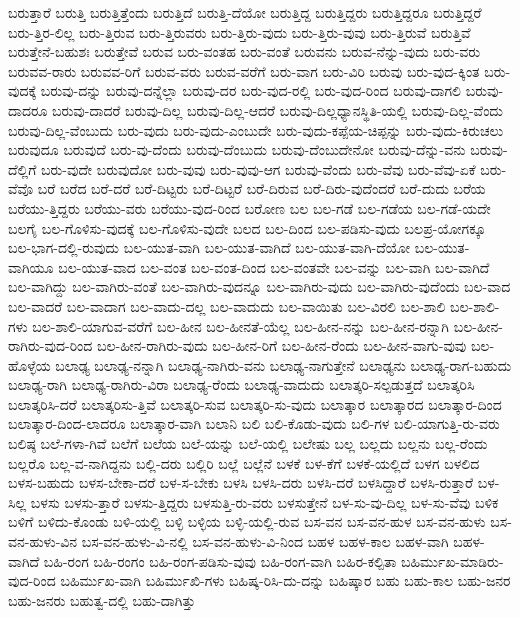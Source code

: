 {ಬರುತ್ತಾರೆ
ಬರುತ್ತಿ
ಬರುತ್ತಿತ್ತೆಂದು
ಬರುತ್ತಿದೆ
ಬರುತ್ತಿ-ದೆಯೋ
ಬರುತ್ತಿದ್ದ
ಬರುತ್ತಿದ್ದರು
ಬರುತ್ತಿದ್ದರೂ
ಬರುತ್ತಿದ್ದರೆ
ಬರು-ತ್ತಿರ-ಲಿಲ್ಲ
ಬರು-ತ್ತಿರುವ
ಬರು-ತ್ತಿರುವರು
ಬರು-ತ್ತಿರು-ವುದು
ಬರು-ತ್ತಿರು-ವುವು
ಬರು-ತ್ತಿರುವೆ
ಬರುತ್ತಿವೆ
ಬರುತ್ತೇನೆ-ಬಹುಶಃ
ಬರುತ್ತೇವೆ
ಬರುವ
ಬರು-ವಂತಹ
ಬರು-ವಂತೆ
ಬರುವನು
ಬರುವ-ನೆನ್ನು-ವುದು
ಬರು-ವರು
ಬರುವವ-ರಾರು
ಬರುವವ-ರಿಗೆ
ಬರುವ-ವರು
ಬರುವ-ವರೆಗೆ
ಬರು-ವಾಗ
ಬರು-ವಿರಿ
ಬರುವು
ಬರು-ವುದ-ಕ್ಕಿಂತ
ಬರು-ವುದಕ್ಕೆ
ಬರುವು-ದನ್ನು
ಬರುವು-ದನ್ನೆಲ್ಲಾ
ಬರುವು-ದರ
ಬರು-ವುದ-ರಲ್ಲಿ
ಬರು-ವುದ-ರಿಂದ
ಬರುವು-ದಾಗಲಿ
ಬರುವು-ದಾದರೂ
ಬರುವು-ದಾದರೆ
ಬರುವು-ದಿಲ್ಲ
ಬರುವು-ದಿಲ್ಲ-ಆದರೆ
ಬರುವು-ದಿಲ್ಲಧ್ಯಾನಸ್ಥಿತಿ-ಯಲ್ಲಿ
ಬರುವು-ದಿಲ್ಲ-ವೆಂದು
ಬರುವು-ದಿಲ್ಲ-ವೆಂಬುದು
ಬರು-ವುದು
ಬರು-ವುದು-ಎಂಬುದೇ
ಬರು-ವುದು-ಕಪ್ಪೆಯ-ಚಿಪ್ಪನ್ನು
ಬರು-ವುದು-ಕಿರುಚಲು
ಬರುವುದೂ
ಬರುವುದೆ
ಬರು-ವು-ದೆಂದು
ಬರುವು-ದೆಂಬುದು
ಬರುವು-ದೆಂಬುದೇನೋ
ಬರುವು-ದೆನ್ನು-ವನು
ಬರುವು-ದೆಲ್ಲಿಗೆ
ಬರು-ವುದೇ
ಬರುವುದೋ
ಬರು-ವುವು
ಬರು-ವುವು-ಆಗ
ಬರುವು-ವೆಂದು
ಬರು-ವೆವು
ಬರು-ವೆವು-ಏಕೆ
ಬರು-ವೆವೊ
ಬರೆ
ಬರೆದ
ಬರೆ-ದರೆ
ಬರೆ-ದಿಟ್ಟರು
ಬರೆ-ದಿಟ್ಟರೆ
ಬರೆ-ದಿರುವ
ಬರೆ-ದಿರು-ವುದೆಂದರೆ
ಬರೆ-ದುದು
ಬರೆಯ
ಬರೆಯು-ತ್ತಿದ್ದರು
ಬರೆಯು-ವರು
ಬರೆಯು-ವುದ-ರಿಂದ
ಬರೋಣ
ಬಲ
ಬಲ-ಗಡೆ
ಬಲ-ಗಡೆಯ
ಬಲ-ಗಡೆ-ಯದೇ
ಬಲಗೈ
ಬಲ-ಗೊಳಿಸು-ವುದಕ್ಕೆ
ಬಲ-ಗೊಳಿಸು-ವುದೇ
ಬಲದ
ಬಲ-ದಿಂದ
ಬಲ-ಪಡಿಸು-ವುದು
ಬಲಪ್ರ-ಯೋಗಕ್ಕೂ
ಬಲ-ಭಾಗ-ದಲ್ಲಿ-ರುವುದು
ಬಲ-ಯುತ-ವಾಗಿ
ಬಲ-ಯುತ-ವಾಗಿದೆ
ಬಲ-ಯುತ-ವಾಗಿ-ದೆಯೋ
ಬಲ-ಯುತ-ವಾಗಿಯೂ
ಬಲ-ಯುತ-ವಾದ
ಬಲ-ವಂತ
ಬಲ-ವಂತ-ದಿಂದ
ಬಲ-ವಂತವೇ
ಬಲ-ವನ್ನು
ಬಲ-ವಾಗಿ
ಬಲ-ವಾಗಿದೆ
ಬಲ-ವಾಗಿದ್ದು
ಬಲ-ವಾಗಿರು-ವಂತೆ
ಬಲ-ವಾಗಿರು-ವುದನ್ನೂ
ಬಲ-ವಾಗಿರು-ವುದು
ಬಲ-ವಾಗಿರು-ವುದೆಂದು
ಬಲ-ವಾದ
ಬಲ-ವಾದರೆ
ಬಲ-ವಾದಾಗ
ಬಲ-ವಾದು-ದಲ್ಲ
ಬಲ-ವಾದುದು
ಬಲ-ವಾಯಿತು
ಬಲ-ವಿರಲಿ
ಬಲ-ಶಾಲಿ
ಬಲ-ಶಾಲಿ-ಗಳು
ಬಲ-ಶಾಲಿ-ಯಾಗುವ-ವರೆಗೆ
ಬಲ-ಹೀನ
ಬಲ-ಹೀನತೆ-ಯೆಲ್ಲ
ಬಲ-ಹೀನ-ನನ್ನು
ಬಲ-ಹೀನ-ರನ್ನಾಗಿ
ಬಲ-ಹೀನ-ರಾಗಿರು-ವುದ-ರಿಂದ
ಬಲ-ಹೀನ-ರಾಗಿರು-ವುದು
ಬಲ-ಹೀನ-ರಿಗೆ
ಬಲ-ಹೀನ-ರೆಂದು
ಬಲ-ಹೀನ-ವಾಗು-ವುವು
ಬಲ-ಹೊಳ್ಳೆಯ
ಬಲಾಢ್ಯ
ಬಲಾಢ್ಯ-ನನ್ನಾಗಿ
ಬಲಾಢ್ಯ-ನಾಗಿರು-ವನು
ಬಲಾಢ್ಯ-ನಾಗುತ್ತೇನೆ
ಬಲಾಢ್ಯನು
ಬಲಾಢ್ಯ-ರಾಗ-ಬಹುದು
ಬಲಾಢ್ಯ-ರಾಗಿ
ಬಲಾಢ್ಯ-ರಾಗಿರು-ವಿರಾ
ಬಲಾಢ್ಯ-ರೆಂದು
ಬಲಾಢ್ಯ-ವಾದುದು
ಬಲಾತ್ಕರಿ-ಸಲ್ಪಡುತ್ತದೆ
ಬಲಾತ್ಕರಿಸಿ
ಬಲಾತ್ಕರಿಸಿ-ದರೆ
ಬಲಾತ್ಕರಿಸು-ತ್ತಿವೆ
ಬಲಾತ್ಕರಿ-ಸುವ
ಬಲಾತ್ಕರಿ-ಸು-ವುದು
ಬಲಾತ್ಕಾರ
ಬಲಾತ್ಕಾರದ
ಬಲಾತ್ಕಾರ-ದಿಂದ
ಬಲಾತ್ಕಾರ-ದಿಂದ-ಲಾದರೂ
ಬಲಾತ್ಕಾರ-ವಾಗಿ
ಬಲಾನಿ
ಬಲಿ
ಬಲಿ-ಕೊಡು-ವುದು
ಬಲಿ-ಗಳ
ಬಲಿ-ಯಾಗುತ್ತಿ-ರು-ವರು
ಬಲಿಷ್ಠ
ಬಲೆ-ಗಳಾ-ಗಿವೆ
ಬಲೆಗೆ
ಬಲೆಯ
ಬಲೆ-ಯನ್ನು
ಬಲೆ-ಯಲ್ಲಿ
ಬಲೇಷು
ಬಲ್ಲ
ಬಲ್ಲದು
ಬಲ್ಲನು
ಬಲ್ಲ-ರೆಂದು
ಬಲ್ಲರೊ
ಬಲ್ಲ-ವ-ನಾಗಿದ್ದನು
ಬಲ್ಲಿ-ದರು
ಬಲ್ಲಿರಿ
ಬಲ್ಲೆ
ಬಲ್ಲೆನೆ
ಬಳಕೆ
ಬಳ-ಕೆಗೆ
ಬಳಕೆ-ಯಲ್ಲಿದೆ
ಬಳಗ
ಬಳಲಿದ
ಬಳಸ-ಬಹುದು
ಬಳಸ-ಬೇಕಾ-ದರೆ
ಬಳ-ಸ-ಬೇಕು
ಬಳಸಿ
ಬಳಸಿ-ದರು
ಬಳಸಿ-ದರೆ
ಬಳಸಿದ್ದಾರೆ
ಬಳಸಿ-ರುತ್ತಾರೆ
ಬಳ-ಸಿಲ್ಲ
ಬಳಸು
ಬಳಸು-ತ್ತಾರೆ
ಬಳಸು-ತ್ತಿದ್ದರು
ಬಳಸುತ್ತಿ-ರು-ವರು
ಬಳಸುತ್ತೇನೆ
ಬಳ-ಸು-ವು-ದಿಲ್ಲ
ಬಳ-ಸು-ವೆವು
ಬಳಿಕ
ಬಳಿಗೆ
ಬಳಿದು-ಕೊಂಡು
ಬಳಿ-ಯಲ್ಲಿ
ಬಳ್ಳಿ
ಬಳ್ಳಿಯ
ಬಳ್ಳಿ-ಯಲ್ಲಿ-ರುವ
ಬಸ-ವನ
ಬಸ-ವನ-ಹುಳ
ಬಸ-ವನ-ಹುಳು
ಬಸ-ವನ-ಹುಳು-ವಿನ
ಬಸ-ವನ-ಹುಳು-ವಿ-ನಲ್ಲಿ
ಬಸ-ವನ-ಹುಳು-ವಿ-ನಿಂದ
ಬಹಳ
ಬಹಳ-ಕಾಲ
ಬಹಳ-ವಾಗಿ
ಬಹಳ-ವಾಗಿದೆ
ಬಹಿ-ರಂಗ
ಬಹಿ-ರಂಗಂ
ಬಹಿ-ರಂಗ-ಪಡಿಸು-ವುವು
ಬಹಿ-ರಂಗ-ವಾಗಿ
ಬಹಿರ-ಕಲ್ಪಿತಾ
ಬಹಿರ್ಮುಖ-ಮಾಡಿರು-ವುದ-ರಿಂದ
ಬಹಿರ್ಮುಖ-ವಾಗಿ
ಬಹಿರ್ಮುಖಿ-ಗಳು
ಬಹಿಷ್ಕ-ರಿಸಿ-ದು-ದನ್ನು
ಬಹಿಷ್ಕಾರ
ಬಹು
ಬಹು-ಕಾಲ
ಬಹು-ಜನರ
ಬಹು-ಜನರು
ಬಹುತ್ವ-ದಲ್ಲಿ
ಬಹು-ದಾಗಿತ್ತು
}
